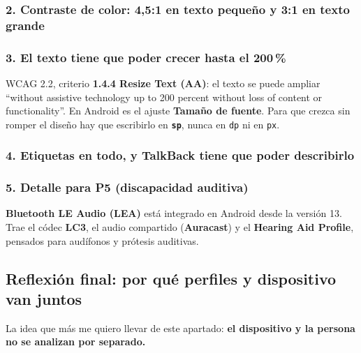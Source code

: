 \documentclass[11pt,a4paper]{article}
\newcommand{\code}[1]{\texttt{\color{navylight}#1}}
\begin{document}
	\subsubsection*{2. Contraste de color: 4,5:1 en texto pequeño y 3:1 en texto grande}
	
	\subsubsection*{3. El texto tiene que poder crecer hasta el 200\,\%}
	
	WCAG 2.2, criterio \textbf{1.4.4 Resize Text (AA)}: el texto se puede ampliar \enquote{without assistive technology up to 200 percent without loss of content or functionality}. En Android es el ajuste \textbf{Tamaño de fuente}. Para que crezca sin romper el diseño hay que escribirlo en \textbf{\code{sp}}, nunca en \code{dp} ni en \code{px}.
	
	\subsubsection*{4. Etiquetas en todo, y TalkBack tiene que poder describirlo}
	
	\subsubsection*{5. Detalle para P5 (discapacidad auditiva)}
	
	\textbf{Bluetooth LE Audio (LEA)} está integrado en Android desde la versión 13. Trae el códec \textbf{LC3}, el audio compartido (\textbf{Auracast}) y el \textbf{Hearing Aid Profile}, pensados para audífonos y prótesis auditivas.
	
	\subsection{Reflexión final: por qué perfiles y dispositivo van juntos}
	
	La idea que más me quiero llevar de este apartado: \textbf{el dispositivo y la persona no se analizan por separado.}
	
\end{document}
